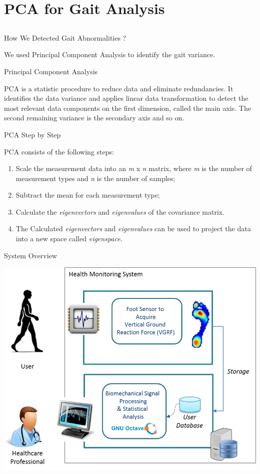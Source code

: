 \documentclass{beamer}
\begin{document}
\section{PCA for Gait Analysis}
\subsection{}
\begin{frame}{How We Detected Gait Abnormalities ?}
	\begin{block}{}
	We used Principal Component Analysis to identify the gait variance.
	\end{block}
\end{frame}


\begin{frame}{Principal Component Analysis}
	\begin{block}{}
	PCA is a statistic procedure to reduce data and eliminate redundancies. It identifies the data variance and applies linear data transformation to detect the most relevant data components on the first dimension, called the main axis.  The second remaining variance is the secondary axis and so on.
	\end{block}
\end{frame}

\begin{frame}{PCA Step by Step}
	\begin{block}{}
	PCA consists of the following steps: 
		\begin{enumerate}[<+->]
				 \item Scale the measurement data into an \textit{m} x \textit{n} matrix, where \textit{m} is the number of measurement types and \textit{n} is the number of samples;
				 \item Subtract the mean for each measurement type;
				 \item Calculate the \textit{eigenvectors} and \textit{eigenvalues} of the covariance matrix.
				 \item The Calculated \textit{eigenvectors} and \textit{eigenvalues} can be used to project the data into a new space called \textit{eigenspace}.
		\end{enumerate}
	\end{block}
\end{frame}

\begin{frame}{System Overview}
		 \begin{block}{}
			\begin{center}
				\includegraphics[height=2.2 in]{img/systemoverview.png}
			\end{center}
		 \end{block}
\end{frame}
\end{document}
